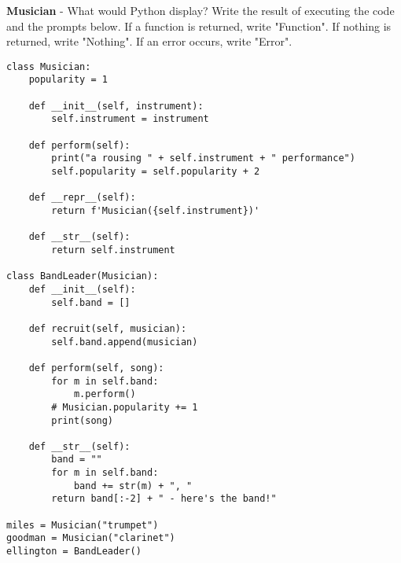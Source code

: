 \begin{blocksection}
\question \textbf{Musician} - What would Python display? Write the result of executing the code and the prompts below. If a function is returned, write "Function". If nothing is returned, write "Nothing". If an error occurs, write "Error".

\begin{lstlisting}
class Musician:
    popularity = 1
    
    def __init__(self, instrument):
        self.instrument = instrument 
    
    def perform(self):
        print("a rousing " + self.instrument + " performance")
        self.popularity = self.popularity + 2 
        
    def __repr__(self):
        return f'Musician({self.instrument})'
    
    def __str__(self):
        return self.instrument
        
class BandLeader(Musician): 
    def __init__(self):
        self.band = []
        
    def recruit(self, musician):
        self.band.append(musician) 
    
    def perform(self, song):
        for m in self.band: 
            m.perform()
        # Musician.popularity += 1
        print(song) 
        
    def __str__(self):
        band = ""
        for m in self.band:
            band += str(m) + ", " 
        return band[:-2] + " - here's the band!" 

miles = Musician("trumpet")
goodman = Musician("clarinet")
ellington = BandLeader()
\end{lstlisting}
\end{blocksection}

\newpage

